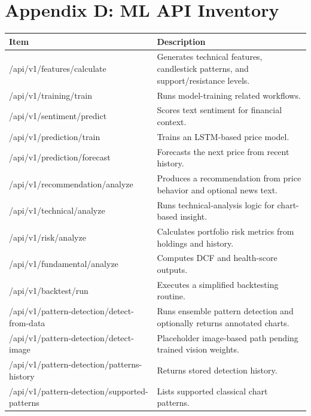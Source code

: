 \documentclass[11pt,a4paper]{article}
\begin{document}
\section*{Appendix D: ML API Inventory}
\begin{longtable}{p{} p{}}
\textbf{Item} & \textbf{Description} \\ \hline
/api/v1/features/calculate & Generates technical features, candlestick patterns, and support/resistance levels. \\
/api/v1/training/train & Runs model-training related workflows. \\
/api/v1/sentiment/predict & Scores text sentiment for financial context. \\
/api/v1/prediction/train & Trains an LSTM-based price model. \\
/api/v1/prediction/forecast & Forecasts the next price from recent history. \\
/api/v1/recommendation/analyze & Produces a recommendation from price behavior and optional news text. \\
/api/v1/technical/analyze & Runs technical-analysis logic for chart-based insight. \\
/api/v1/risk/analyze & Calculates portfolio risk metrics from holdings and history. \\
/api/v1/fundamental/analyze & Computes DCF and health-score outputs. \\
/api/v1/backtest/run & Executes a simplified backtesting routine. \\
/api/v1/pattern-detection/detect-from-data & Runs ensemble pattern detection and optionally returns annotated charts. \\
/api/v1/pattern-detection/detect-image & Placeholder image-based path pending trained vision weights. \\
/api/v1/pattern-detection/patterns-history & Returns stored detection history. \\
/api/v1/pattern-detection/supported-patterns & Lists supported classical chart patterns. \\
\end{longtable}
\end{document}
